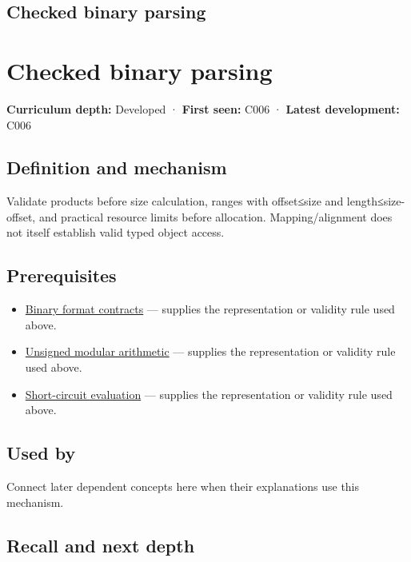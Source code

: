\hypertarget{appendix-652d81568de9}{}
\section*{Checked binary parsing}
\chapter{Checked binary parsing}\label{appendix-652d81568de9-checked-binary-parsing}

\textbf{Curriculum depth:} Developed · \textbf{First seen:} C006 · \textbf{Latest development:} C006

\section{Definition and mechanism}\label{appendix-652d81568de9-definition-and-mechanism}

Validate products before size calculation, ranges with offset≤size and length≤size-offset, and practical resource limits before allocation. Mapping/alignment does not itself establish valid typed object access.

\section{Prerequisites}\label{appendix-652d81568de9-prerequisites}

\begin{itemize}
\tightlist
\item
  \hyperref[appendix-590bbb2424c1]{Binary format contracts} --- supplies the representation or validity rule used above.
\item
  \hyperref[appendix-c99977d88b33]{Unsigned modular arithmetic} --- supplies the representation or validity rule used above.
\item
  \hyperref[appendix-2e245a6fa8d3]{Short-circuit evaluation} --- supplies the representation or validity rule used above.
\end{itemize}

\section{Used by}\label{appendix-652d81568de9-used-by}

Connect later dependent concepts here when their explanations use this mechanism.

\section{Recall and next depth}\label{appendix-652d81568de9-recall-and-next-depth}

